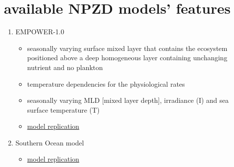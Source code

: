 \documentclass[a4paper,11pt]{article}
\begin{document}
    \section{available NPZD models' features}
    \begin{enumerate}
        \item EMPOWER-1.0\autocite{anderson2015empower}
        \begin{itemize}
            \item seasonally varying surface mixed layer that contains the ecosystem positioned above a deep homogeneous layer containing unchanging nutrient and no plankton
            \item temperature dependencies for the physiological rates
            \item seasonally varying MLD [mixed layer depth], irradiance (I) and sea surface temperature (T)
            \item \href{https://nbviewer.jupyter.org/github/ph-u/Project/blob/master/sandbox/m_NPZD_anderson2015empower.ipynb}{model replication}
        \end{itemize}
        \item Southern Ocean model\autocite{kidston2013phytoplankton}
        \begin{itemize}
            \item \href{https://nbviewer.jupyter.org/github/ph-u/Project/blob/master/sandbox/m_NPZD_kidston2013phytoplankton.ipynb}{model replication}
        \end{itemize}
    \end{enumerate}
    
    \nocite{*}\printbibliography
\end{document}

